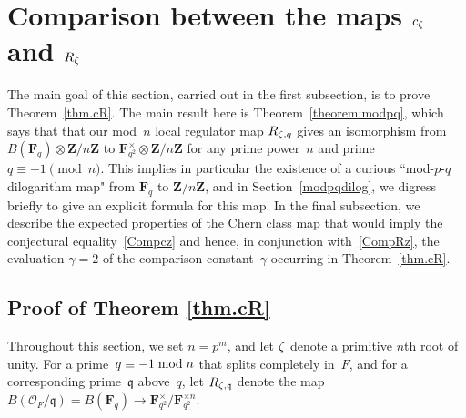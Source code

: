 \documentclass[12pt,reqno]{amsart}
\theoremstyle{definition}
\def\mod{\;\text{\rm mod}\;}
\def\Z{\mathbf Z}   %
\def\F{\mathbf F}   %
\def\nn{n}
\def\ll{m}
\def\q{\mathfrak{q}}
\def\OL{\mathcal{O}}
\begin{document}
\section{Comparison between the maps 
\texorpdfstring{$c_\zeta$}{cz} and  \texorpdfstring{$R_\zeta$}{Rz}}
\label{sec.cRcompare}

The main goal of this section, 
carried out in the first subsection, is to prove 
Theorem~\ref{thm.cR}. The main result here is Theorem~\ref{theorem:modpq}, 
which says that that our mod~$\nn$ local regulator map $R_{\zeta,q}$ gives an 
isomorphism from $B(\F_q)\otimes\Z/n\Z$ to $\F^{\times}_{q^2}\otimes\Z/n\Z$
for any prime power~$n$ and prime $q\equiv-1\!\pmod n$. This implies in 
particular the existence of a curious ``mod-$p$-$q$ dilogarithm map" from 
$\F_q$ to $\Z/n\Z$, and in Section~\ref{modpqdilog}, 
we digress briefly to give an 
explicit formula for this map.  In the final subsection,  we describe the
expected properties of the Chern class map that would imply the conjectural 
equality~\eqref{Compcz} and hence, in conjunction with~\eqref{CompRz}, 
the evaluation $\gamma=2$ of the comparison constant~$\gamma$ occurring 
in Theorem~\ref{thm.cR}. 




\subsection{Proof of Theorem \ref{thm.cR}}
\label{pf.cR}

Throughout this section, we set $n=p^\ll$, and let $\zeta$ denote a primitive 
$\nn$th root of unity.
For a prime~$q \equiv -1 \mod\nn$ that splits completely in~$F$, and 
for a corresponding prime~$\q$ above~$q$, let $R_{\z,\q}$ denote the map 
$B(\OL_F/\q) = B(\F_q) \rightarrow \F^{\times}_{q^2}/\F^{\times \nn}_{q^2}$. 
\end{document}

